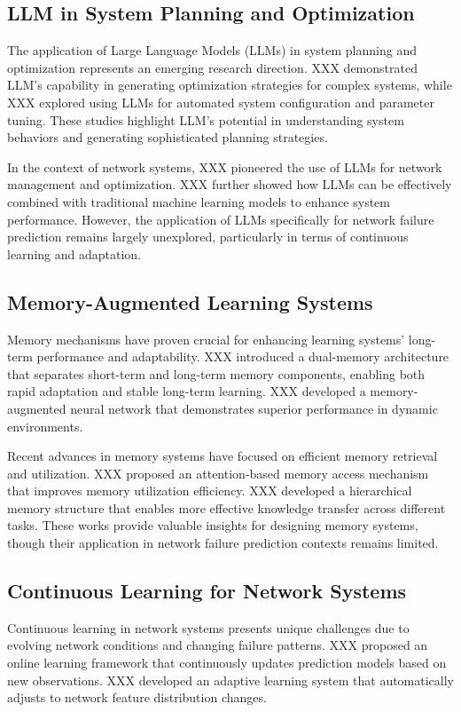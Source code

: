 \documentclass[conference]{IEEEtran}
\begin{document}
\subsection{LLM in System Planning and Optimization}

The application of Large Language Models (LLMs) in system planning and optimization represents an emerging research direction. XXX demonstrated LLM's capability in generating optimization strategies for complex systems, while XXX explored using LLMs for automated system configuration and parameter tuning. These studies highlight LLM's potential in understanding system behaviors and generating sophisticated planning strategies.

In the context of network systems, XXX pioneered the use of LLMs for network management and optimization. XXX further showed how LLMs can be effectively combined with traditional machine learning models to enhance system performance. However, the application of LLMs specifically for network failure prediction remains largely unexplored, particularly in terms of continuous learning and adaptation.

\subsection{Memory-Augmented Learning Systems}

Memory mechanisms have proven crucial for enhancing learning systems' long-term performance and adaptability. XXX introduced a dual-memory architecture that separates short-term and long-term memory components, enabling both rapid adaptation and stable long-term learning. XXX developed a memory-augmented neural network that demonstrates superior performance in dynamic environments.

Recent advances in memory systems have focused on efficient memory retrieval and utilization. XXX proposed an attention-based memory access mechanism that improves memory utilization efficiency. XXX developed a hierarchical memory structure that enables more effective knowledge transfer across different tasks. These works provide valuable insights for designing memory systems, though their application in network failure prediction contexts remains limited.

\subsection{Continuous Learning for Network Systems}

Continuous learning in network systems presents unique challenges due to evolving network conditions and changing failure patterns. XXX proposed an online learning framework that continuously updates prediction models based on new observations. XXX developed an adaptive learning system that automatically adjusts to network feature distribution changes.
\end{document}
